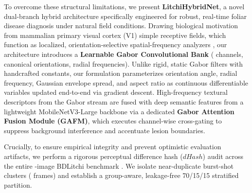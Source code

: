 To overcome these structural limitations, we present \textbf{LitchiHybridNet}, a novel dual-branch hybrid architecture specifically engineered for robust, real-time foliar disease diagnosis under natural field conditions. Drawing biological motivation from mammalian primary visual cortex (V1) simple receptive fields, which function as localized, orientation-selective spatial-frequency analyzers \cite{daugman1985uncertainty}, our architecture introduces a \textbf{Learnable Gabor Convolutional Bank} (\gaborChannels{} channels, \gaborOrientations{} canonical orientations, \gaborFrequencies{} radial frequencies). Unlike rigid, static Gabor filters with handcrafted constants, our formulation parameterizes orientation angle, radial frequency, Gaussian envelope spread, and aspect ratio as continuous differentiable variables updated end-to-end via gradient descent. High-frequency textural descriptors from the Gabor stream are fused with deep semantic features from a lightweight MobileNetV3-Large backbone via a dedicated \textbf{Gabor Attention Fusion Module (GAFM)}, which executes channel-wise cross-gating to suppress background interference and accentuate lesion boundaries.

Crucially, to ensure empirical integrity and prevent optimistic evaluation artifacts, we perform a rigorous perceptual difference hash ($dHash$) audit across the entire \totalImages{}-image BDLitchi benchmark \cite{litchi_dataset_2022}. We isolate \nearDupGroups{} near-duplicate burst-shot clusters (\nearDupImages{} frames) and establish a group-aware, leakage-free 70/15/15 stratified partition.

